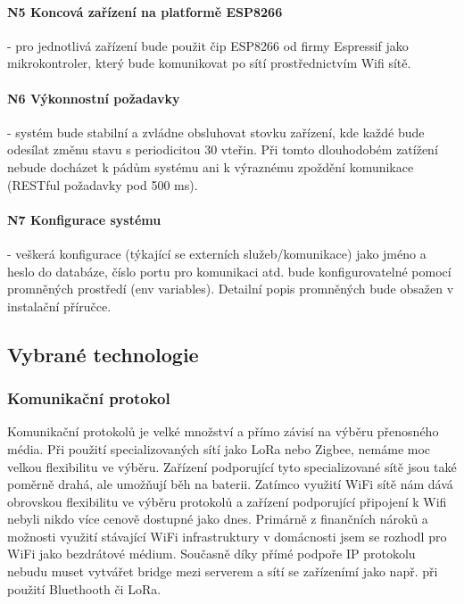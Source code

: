 \paragraph{N5 Koncová zařízení na platformě ESP8266}
- pro jednotlivá zařízení bude použit čip ESP8266 od firmy Espressif jako mikrokontroler, který bude komunikovat po sítí prostřednictvím Wifi sítě.

\paragraph{N6 Výkonnostní požadavky}
- systém bude stabilní a zvládne obsluhovat stovku zařízení, kde každé bude odesílat změnu stavu s periodicitou 30 vteřin. Při tomto dlouhodobém zatížení nebude docházet k pádům systému ani k výraznému zpoždění komunikace (RESTful požadavky pod 500 ms).

\paragraph{N7 Konfigurace systému}
- veškerá konfigurace (týkající se externích služeb/komunikace) jako jméno a heslo do databáze, číslo portu pro komunikaci atd. bude konfigurovatelné pomocí promněných prostředí (env variables). Detailní popis promněných bude obsažen v instalační příručce.

\subsection{Vybrané technologie}

\subsubsection{Komunikační protokol}   %
Komunikační protokolů je velké množství a přímo závisí na výběru přenosného média. Při použití specializovaných sítí jako LoRa nebo Zigbee, nemáme moc velkou flexibilitu ve výběru. Zařízení podporující tyto specializované sítě jsou také poměrně drahá, ale umožňují běh na baterii. Zatímco využití WiFi sítě nám dává obrovskou flexibilitu ve výběru protokolů a zařízení podporující připojení k Wifi nebyli nikdo více cenově dostupné jako dnes. Primárně z finančních nároků a možnosti využití stávající WiFi infrastruktury v domácnosti jsem se rozhodl pro WiFi jako bezdrátové médium. Současně díky přímé podpoře IP protokolu nebudu muset vytvářet bridge mezi serverem a sítí se zařízenímí jako např. při použití Bluethooth či LoRa.

